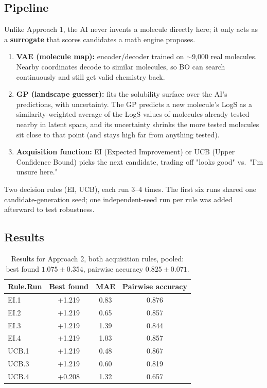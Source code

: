 \documentclass[11pt,a4paper]{article}
\begin{document}
\subsection{Pipeline}
Unlike Approach 1, the AI never invents a molecule directly here; it only acts as a \textbf{surrogate} that scores candidates a math engine proposes.

\begin{enumerate}
    \item \textbf{VAE (molecule map):} encoder/decoder trained on $\sim$9,000 real molecules. Nearby coordinates decode to similar molecules, so BO can search continuously and still get valid chemistry back.
    \item \textbf{GP (landscape guesser):} fits the solubility surface over the AI's predictions, with uncertainty. The GP predicts a new molecule's LogS as a similarity-weighted average of the LogS values of molecules already tested nearby in latent space, and its uncertainty shrinks the more tested molecules sit close to that point (and stays high far from anything tested).
    \item \textbf{Acquisition function:} EI (Expected Improvement) or UCB (Upper Confidence Bound) picks the next candidate, trading off "looks good" vs.\ "I'm unsure here."
\end{enumerate}

Two decision rules (EI, UCB), each run 3--4 times. The first six runs shared one candidate-generation seed; one independent-seed run per rule was added afterward to test robustness.

\subsection{Results}
\begin{table}[h]
\centering
\begin{tabular}{lccc}
\hline
Rule.Run & Best found & MAE & Pairwise accuracy \\
\hline
EI.1  & +1.219 & 0.83 & 0.876 \\
EI.2  & +1.219 & 0.65 & 0.857 \\
EI.3  & +1.219 & 1.39 & 0.844 \\
EI.4  & +1.219 & 1.03 & 0.857 \\
UCB.1 & +1.219 & 0.48 & 0.867 \\
UCB.3 & +1.219 & 0.60 & 0.819 \\
UCB.4 & +0.208 & 1.32 & 0.657 \\
\hline
\end{tabular}
\caption{Results for Approach 2, both acquisition rules, pooled: best found $1.075 \pm 0.354$, pairwise accuracy $0.825 \pm 0.071$.}
\label{tab:results_a2}
\end{table}
\end{document}
